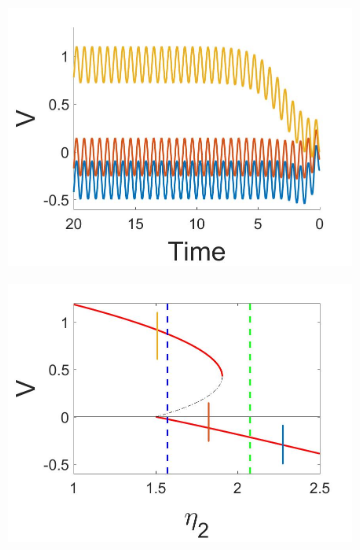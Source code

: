 \begin{figure}[H]
\centering
\begin{subfigure}{.5\textwidth}
  \centering
  \includegraphics[width=\linewidth]{twoD/osc_Vtimeseries.jpg}
  \caption{}
\end{subfigure}%
\begin{subfigure}{.5\textwidth}
  \centering
  \includegraphics[width=\linewidth]{twoD/osc_bif_diagram.jpg}
  \caption{}
\end{subfigure}
\begin{subfigure}{.5\textwidth}
  \centering

\end{subfigure}
\end{figure}
